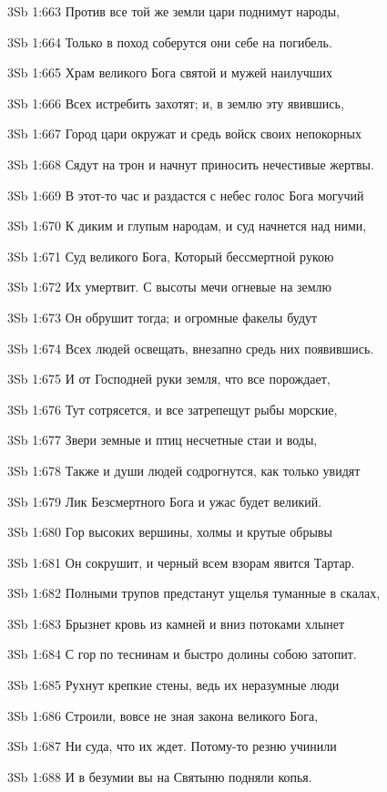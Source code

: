 \vs 3Sb 1:663 Против все той же земли цари поднимут народы, 

\vs 3Sb 1:664 Только в поход соберутся они себе на погибель.

\vs 3Sb 1:665 Храм великого Бога святой и мужей наилучших 

\vs 3Sb 1:666 Всех истребить захотят; и, в землю эту явившись, 

\vs 3Sb 1:667 Город цари окружат и средь войск своих непокорных 

\vs 3Sb 1:668 Сядут на трон и начнут приносить нечестивые жертвы. 

\vs 3Sb 1:669 В этот-то час и раздастся с небес голос Бога могучий

\vs 3Sb 1:670 К диким и глупым народам, и суд начнется над ними, 

\vs 3Sb 1:671 Суд великого Бога, Который бессмертной рукою 

\vs 3Sb 1:672 Их умертвит. С высоты мечи огневые на землю 

\vs 3Sb 1:673 Он обрушит тогда; и огромные факелы будут 

\vs 3Sb 1:674 Всех людей освещать, внезапно средь них появившись.

\vs 3Sb 1:675 И от Господней руки земля, что все порождает, 

\vs 3Sb 1:676 Тут сотрясется, и все затрепещут  рыбы морские, 

\vs 3Sb 1:677 Звери земные и птиц несчетные стаи и воды, 

\vs 3Sb 1:678 Также и души людей содрогнутся, как только увидят 

\vs 3Sb 1:679 Лик Безсмертного Бога  и ужас будет великий.

\vs 3Sb 1:680 Гор высоких вершины, холмы и крутые обрывы 

\vs 3Sb 1:681 Он сокрушит, и черный всем взорам явится Тартар. 

\vs 3Sb 1:682 Полными трупов предстанут ущелья туманные в скалах, 

\vs 3Sb 1:683 Брызнет кровь из камней и вниз потоками хлынет 

\vs 3Sb 1:684 С гор по теснинам и быстро долины собою затопит.

\vs 3Sb 1:685 Рухнут крепкие стены, ведь их неразумные люди 

\vs 3Sb 1:686 Строили, вовсе не зная закона великого Бога, 

\vs 3Sb 1:687 Ни суда, что их ждет. Потому-то резню учинили 

\vs 3Sb 1:688 И в безумии вы на Святыню подняли копья. 

